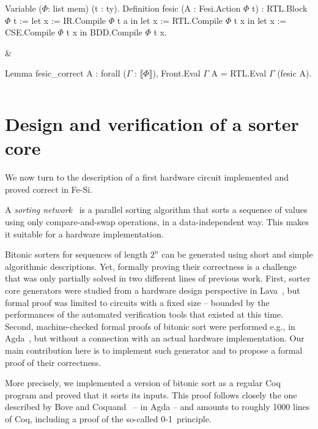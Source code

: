 \documentclass{llncs}
\newcommand{\denote}[1]{\llbracket #1 \rrbracket}
\begin{document}
\begin{twolistings}
  \begin{coq}
Variable ($\Phi$: list mem) (t : ty). 
Definition fesic  (A : Fesi.Action $\Phi$ t) : RTL.Block $\Phi$ t :=
  let x := IR.Compile $\Phi$  t a in
  let x := RTL.Compile $\Phi$ t x in 
  let x := CSE.Compile $\Phi$ t x in  
  BDD.Compile $\Phi$ t x.
\end{coq}
&
\begin{coq}
Lemma fesic_correct A :
forall ($\Gamma$ : $\denote{\Phi}$), 
Front.Eval $\Gamma$ A = 
RTL.Eval $\Gamma$ (fesic A).

$ $
\end{coq}
\end{twolistings}


\section{Design and verification of a sorter core}
We now turn to the description of a first hardware circuit implemented
and proved correct in Fe-Si. 

A \emph{sorting network}~\cite{DBLP:books/mg/CormenLRS01} is a
parallel sorting algorithm that sorts a sequence of values using only
compare-and-swap operations, in a data-independent way. This makes it
suitable for a hardware implementation.

Bitonic sorters for sequences of length $2^n$ can be generated using
short and simple algorithmic descriptions. Yet, formally proving their
correctness is a challenge that was only partially solved in two
different lines of previous work.
%
First, sorter core generators were studied from a hardware design
perspective in Lava~\cite{DBLP:conf/charme/ClaessenSS01}, but formal
proof was limited to circuits with a fixed size -- bounded by the
performances of the automated verification tools that existed at this
time.
%
Second, machine-checked formal proofs of bitonic sort were performed
e.g., in Agda~\cite{DBLP:conf/types/BoveC04}, but without a
connection with an actual hardware implementation. 
%
Our main contribution here is to implement such generator and to
propose a formal proof of their correctness.

More precisely, we implemented a version of bitonic sort as a regular
Coq program and proved that it sorts its inputs. This proof follows
closely the one described by Bove and
Coquand~\cite{DBLP:conf/types/BoveC04} -- in Agda -- and amounts to
roughly 1000 lines of Coq, including a proof of the so-called
\mbox{0-1~principle}.
\end{document}
